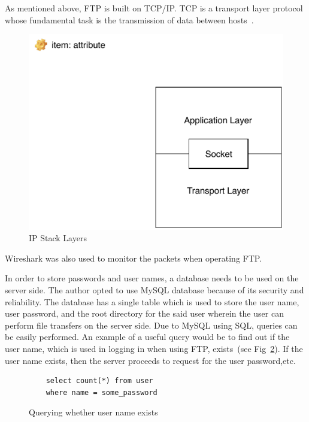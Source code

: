 \documentclass[journal, a4paper]{IEEEtran}
\begin{document}
As mentioned above, FTP is built on TCP/IP. TCP is a transport layer protocol whose fundamental task is the transmission of data between hosts~\cite{cn,mg}.

\begin{figure}[hbtp!]
	\centering
	\includegraphics[scale = 1.2]{socket}
	\caption{IP Stack Layers}
	\label {socket}
\end{figure}


Wireshark was also used to monitor the packets when operating FTP.

In order to store passwords and user names, a database needs to be used on the server side. The author opted to use MySQL database because of its security and reliability. The database has a single table which is used to store the user name, user password, and the root directory for the said user wherein the user can perform file transfers on the server side. Due to MySQL using SQL, queries can be easily performed. An example of a useful query would be to find out if the user name, which is used in logging in when using FTP, exists~(see Fig~\ref{qu}). If the user name exists, then the server proceeds to request for the user password,etc.

\begin{figure}[hbtp]
	\begin{lstlisting}
	select count(*) from user 
	where name = some_password
	\end{lstlisting}
	\caption{Querying whether user name exists}
	\label {qu}
\end{figure}
\end{document}
